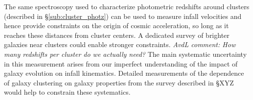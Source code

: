 The same spectroscopy used to characterize photometric redshifts around clusters (described in \S \ref{sub:cluster_photz}) can be used to measure infall velocities and hence provide constraints on the origin of cosmic acceleration, so long as it reaches these distances from cluster centers.  A dedicated survey of brighter galaxies near clusters could enable stronger constraints.  {\it AvdL comment: 
How many redshifts per cluster do we actually need?}
%
% 
The main systematic uncertainty in this measurement arises from our imperfect understanding of the impact of galaxy evolution on infall kinematics.  Detailed measurements of the dependence of galaxy clustering on galaxy properties from the survey described in \S XYZ would help to constrain these systematics. 




